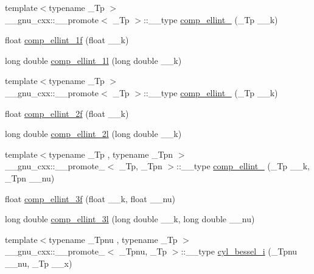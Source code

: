 \begin{DoxyCompactItemize}
\item 
{\footnotesize template$<$typename \+\_\+\+Tp $>$ }\\\+\_\+\+\_\+gnu\+\_\+cxx\+::\+\_\+\+\_\+promote$<$ \+\_\+\+Tp $>$\+::\+\_\+\+\_\+type \hyperlink{group__tr29124__math__spec__func_gac559500c604c43ea943d593c9ad9d289}{comp\+\_\+ellint\+\_} (\+\_\+\+Tp \+\_\+\+\_\+k)
\item 
float \hyperlink{group__tr29124__math__spec__func_ga7fb5be999a8125cf7e55e630eb8444a1}{comp\+\_\+ellint\+\_\+1f} (float \+\_\+\+\_\+k)
\item 
long double \hyperlink{group__tr29124__math__spec__func_ga7247d3dd77c1ff5df3c059fed862dc48}{comp\+\_\+ellint\+\_\+1l} (long double \+\_\+\+\_\+k)
\item 
{\footnotesize template$<$typename \+\_\+\+Tp $>$ }\\\+\_\+\+\_\+gnu\+\_\+cxx\+::\+\_\+\+\_\+promote$<$ \+\_\+\+Tp $>$\+::\+\_\+\+\_\+type \hyperlink{group__tr29124__math__spec__func_ga22fcc678829f0daf2de257896378e7e0}{comp\+\_\+ellint\+\_} (\+\_\+\+Tp \+\_\+\+\_\+k)
\item 
float \hyperlink{group__tr29124__math__spec__func_ga21700f2f125c42b1f1da1f9c7eea1135}{comp\+\_\+ellint\+\_\+2f} (float \+\_\+\+\_\+k)
\item 
long double \hyperlink{group__tr29124__math__spec__func_ga47b647ec386c8d4b18a030c97842df18}{comp\+\_\+ellint\+\_\+2l} (long double \+\_\+\+\_\+k)
\item 
{\footnotesize template$<$typename \+\_\+\+Tp , typename \+\_\+\+Tpn $>$ }\\\+\_\+\+\_\+gnu\+\_\+cxx\+::\+\_\+\+\_\+promote\+\_$<$ \+\_\+\+Tp, \+\_\+\+Tpn $>$\+::\+\_\+\+\_\+type \hyperlink{group__tr29124__math__spec__func_gad833404645e24b7f0598a640ff92d623}{comp\+\_\+ellint\+\_} (\+\_\+\+Tp \+\_\+\+\_\+k, \+\_\+\+Tpn \+\_\+\+\_\+nu)
\item 
float \hyperlink{group__tr29124__math__spec__func_ga76834d3112f777703330892303267a39}{comp\+\_\+ellint\+\_\+3f} (float \+\_\+\+\_\+k, float \+\_\+\+\_\+nu)
\item 
long double \hyperlink{group__tr29124__math__spec__func_ga1ca081fee102cd0d4d6b091285e495e5}{comp\+\_\+ellint\+\_\+3l} (long double \+\_\+\+\_\+k, long double \+\_\+\+\_\+nu)
\item 
{\footnotesize template$<$typename \+\_\+\+Tpnu , typename \+\_\+\+Tp $>$ }\\\+\_\+\+\_\+gnu\+\_\+cxx\+::\+\_\+\+\_\+promote\+\_$<$ \+\_\+\+Tpnu, \+\_\+\+Tp $>$\+::\+\_\+\+\_\+type \hyperlink{group__tr29124__math__spec__func_ga1c9b5a5c36f000a4f0a55f7fcc486cb0}{cyl\+\_\+bessel\+\_\+i} (\+\_\+\+Tpnu \+\_\+\+\_\+nu, \+\_\+\+Tp \+\_\+\+\_\+x)

\end{DoxyCompactItemize}
